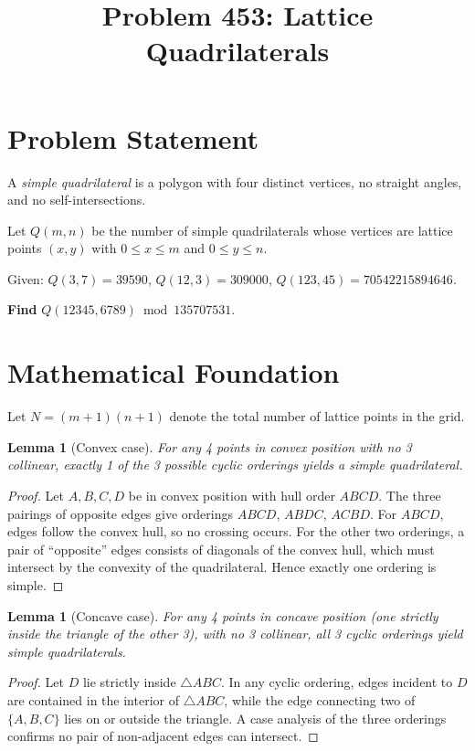 \documentclass[12pt,a4paper]{article}
\title{Problem 453: Lattice Quadrilaterals}
\author{}
\date{}
\newtheorem{lemma}[theorem]{Lemma}
\begin{document}
\maketitle

\section{Problem Statement}

A \emph{simple quadrilateral} is a polygon with four distinct vertices, no straight angles, and no self-intersections.

Let $Q(m, n)$ be the number of simple quadrilaterals whose vertices are lattice points $(x, y)$ with $0 \le x \le m$ and $0 \le y \le n$.

Given: $Q(3, 7) = 39590$, $Q(12, 3) = 309000$, $Q(123, 45) = 70542215894646$.

\textbf{Find} $Q(12345, 6789) \bmod 135707531$.

\section{Mathematical Foundation}

Let $N = (m+1)(n+1)$ denote the total number of lattice points in the grid.

\begin{lemma}[Convex case]\label{lem:convex}
For any 4 points in convex position with no 3 collinear, exactly 1 of the 3 possible cyclic orderings yields a simple quadrilateral.
\end{lemma}

\begin{proof}
Let $A, B, C, D$ be in convex position with hull order $ABCD$. The three pairings of opposite edges give orderings $ABCD$, $ABDC$, $ACBD$. For $ABCD$, edges follow the convex hull, so no crossing occurs. For the other two orderings, a pair of ``opposite'' edges consists of diagonals of the convex hull, which must intersect by the convexity of the quadrilateral. Hence exactly one ordering is simple.
\end{proof}

\begin{lemma}[Concave case]\label{lem:concave}
For any 4 points in concave position (one strictly inside the triangle of the other 3), with no 3 collinear, all 3 cyclic orderings yield simple quadrilaterals.
\end{lemma}

\begin{proof}
Let $D$ lie strictly inside $\triangle ABC$. In any cyclic ordering, edges incident to $D$ are contained in the interior of $\triangle ABC$, while the edge connecting two of $\{A, B, C\}$ lies on or outside the triangle. A case analysis of the three orderings confirms no pair of non-adjacent edges can intersect.
\end{proof}
\end{document}
